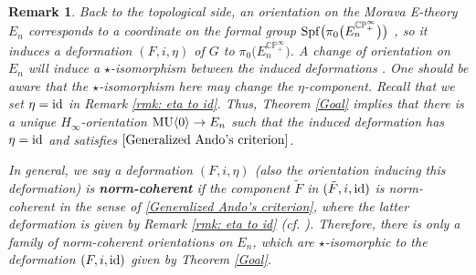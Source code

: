 \documentclass[12pt]{article}
\newtheorem{remark}[theorem]{Remark}
\theoremstyle{definition}
\def\CP{\mathbb{CP}}
\def\Spf{{\rm Spf}}
\def\MU{{\rm MU}}
\begin{document}
    \begin{remark}
        Back to the topological side, an orientation on the Morava E-theory $E_n$ corresponds to a coordinate on the formal group $\Spf\bigl(\pi_0\bigl(E_n^{\CP_+^\infty}\bigr)\bigr)$ \cite[Example 2.53]{AHS01}, so it induces a deformation $(F,i,\eta)$ of $G$ to $\pi_0\bigl(E_n^{\CP_+^\infty}\bigr)$. A change of orientation on $E_n$ will induce a $\star$-isomorphism between the induced deformations \cite[Example 4.9]{Zhu20}. One should be aware that the $\star$-isomorphism here may change the $\eta$-component. Recall that we set $\eta = \rm{id}$ in Remark \ref{rmk: eta to id}. Thus, Theorem \ref{Goal} implies that there is a unique $H_\infty$-orientation $\MU\langle 0 \rangle \to E_n$ such that the induced deformation has $\eta = \rm{id}$ and satisfies $\eqref{Generalized Ando's criterion}$. \par 
        In general, we say a deformation $(F,i,\eta)$ (also the orientation inducing this deformation) is \textbf{\em norm-coherent} if the component $\tilde{F}$ in $(\tilde{F},i,{\rm id})$ is norm-coherent in the sense of \eqref{Generalized Ando's criterion}, where the latter deformation is given by Remark \ref{rmk: eta to id} (cf. \cite[Definition 6.21]{Zhu20}). Therefore, there is only a family of norm-coherent orientations on $E_n$, which are $\star$-isomorphic to the deformation $(F,i,{\rm id})$ given by Theorem \ref{Goal}. 
    \end{remark}
\end{document}
